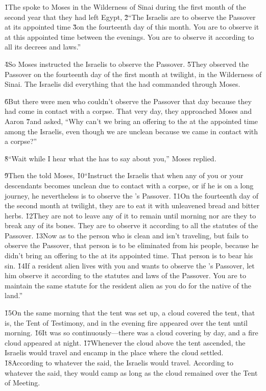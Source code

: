 \v{1}The  spoke to Moses in the Wilderness of Sinai during the first month of the second year that they had left Egypt, \v{2}``The Israelis are to observe the Passover at its appointed time \v{3}on the fourteenth day of this month. You are to observe it at this appointed time between the evenings. You are to observe it according to all its decrees and laws.''

\v{4}So Moses instructed the Israelis to observe the Passover. \v{5}They observed the Passover on the fourteenth day of the first month at twilight, in the Wilderness of Sinai. The Israelis did everything that the  had commanded through Moses.

\v{6}But there were men who couldn't observe the Passover that day because they had come in contact with a corpse. That very day, they approached Moses and Aaron \v{7}and asked, ``Why can't we bring an offering to the  at the appointed time among the Israelis, even though we are unclean because we came in contact with a corpse?''

\v{8}``Wait while I hear what the  has to say about you,'' Moses replied.

\v{9}Then the  told Moses, \v{10}``Instruct the Israelis that when any of you or your descendants becomes unclean due to contact with a corpse, or if he is on a long journey, he nevertheless is to observe the 's Passover. \v{11}On the fourteenth day of the second month at twilight, they are to eat it with unleavened bread and bitter herbs. \v{12}They are not to leave any of it to remain until morning nor are they to break any of its bones. They are to observe it according to all the statutes of the Passover. \v{13}Now as to the person who is clean and isn't traveling, but fails to observe the Passover, that person is to be eliminated from his people, because he didn't bring an offering to the  at its appointed time. That person is to bear his sin. \v{14}If a resident alien lives with you and wants to observe the 's Passover, let him observe it according to the statutes and laws of the Passover. You are to maintain the same statute for the resident alien as you do for the native of the land.''

\v{15}On the same morning that the tent was set up, a cloud covered the tent, that is, the Tent of Testimony, and in the evening fire appeared over the tent until morning. \v{16}It was so continuously---there was a cloud covering by day, and a fire cloud appeared at night. \v{17}Whenever the cloud above the tent ascended, the Israelis would travel and encamp in the place where the cloud settled. \v{18}According to whatever the  said, the Israelis would travel. According to whatever the  said, they would camp as long as the cloud remained over the Tent of Meeting.

